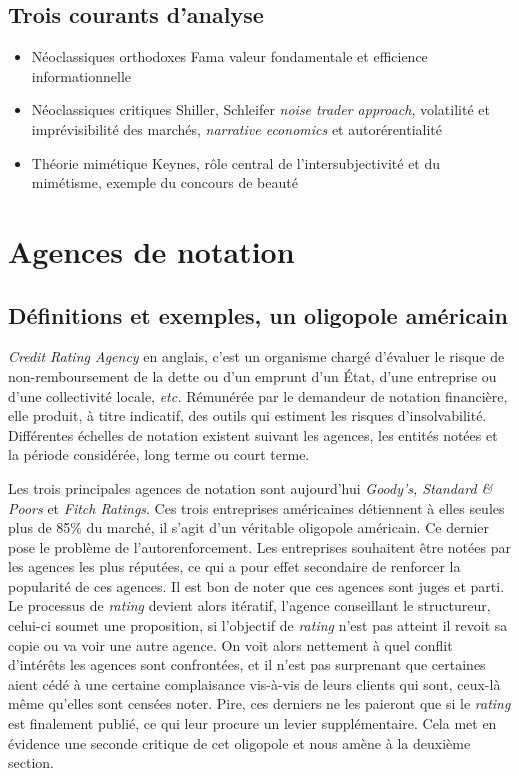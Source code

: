 \documentclass[main.tex]{subfiles}
\begin{document}
\subsection{Trois courants d'analyse}

\begin{itemize}
        \item Néoclassiques orthodoxes Fama valeur fondamentale et efficience informationnelle
        \item Néoclassiques critiques Shiller, Schleifer \textit{noise trader approach}, volatilité et imprévisibilité des marchés, \textit{narrative economics} et autorérentialité
        \item Théorie mimétique Keynes, rôle central de l'intersubjectivité et du mimétisme, exemple du concours de beauté
\end{itemize}

\section{Agences de notation}

\subsection{Définitions et exemples, un oligopole américain}

\begin{definition}
        \emph{Credit Rating Agency} en anglais, c'est un organisme chargé d'évaluer le risque de non-remboursement de la dette ou d'un emprunt d'un État, d'une entreprise ou d'une collectivité locale, \textit{etc.} Rémunérée par le demandeur de notation financière, elle produit, à titre indicatif, des outils qui estiment les risques d'insolvabilité. Différentes échelles de notation existent suivant les agences, les entités notées et la période considérée, long terme ou court terme. 
\end{definition}

Les trois principales agences de notation sont aujourd'hui \emph{Goody's, Standard \& Poors} et \emph{Fitch Ratings}. Ces trois entreprises  américaines détiennent à elles seules plus de 85\% du marché, il s'agit d'un véritable oligopole américain.  Ce dernier pose le problème de l'autorenforcement. Les entreprises souhaitent être notées par les agences les plus réputées, ce qui a pour effet secondaire de renforcer la popularité de ces agences. Il est bon de noter que ces agences sont juges et parti. Le processus de \emph{rating} devient alors itératif, l'agence conseillant le structureur, celui-ci soumet une proposition, si l'objectif de \emph{rating} n'est pas atteint il revoit sa copie ou va voir une autre agence. On voit alors nettement à quel conflit d'intérêts les agences sont confrontées, et il n'est pas surprenant que certaines aient cédé à une certaine complaisance vis-à-vis de leurs clients qui sont, ceux-là même qu'elles sont censées noter. Pire, ces derniers ne les paieront que si le \emph{rating} est finalement publié, ce qui leur procure un levier supplémentaire. Cela met en évidence une seconde critique de cet oligopole et nous amène à la deuxième section.
\end{document}

